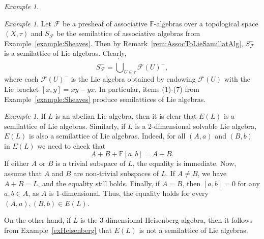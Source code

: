 \documentclass[10pt,a4paper]{amsart}
\theoremstyle{definition}
\theoremstyle{remark}
\newtheorem{ex}[thm]{Example}
\numberwithin{equation}{section}
\newtheorem*{Theorem A}{\textbf{Theorem A}}
\newtheorem*{Corollary E}{\textbf{Corollary E}}
\newtheorem*{Corollary F}{\textbf{Corollary F}}
\newtheorem*{Theorem B}{\textbf{Theorem B}}
\newtheorem*{Theorem C}{\textbf{Theorem C}}
\newtheorem*{Theorem D}{\textbf{Theorem B}}
\newtheorem*{p a}{\textbf{Proof of  Theorem A}}
\newtheorem*{p b}{\textbf{Proof of Theorem B}}
\newtheorem*{p c}{\textbf{Proof of  Theorem C}}
\newtheorem*{p d}{\textbf{Proof of  Theorem D}}
\newcommand{\C}{\mathbb{C}}
\newcommand{\0}{{\vartheta}}
\begin{document}
\begin{ex}
\begin{enumerate}
\end{enumerate}

\end{ex}

\begin{ex}\label{example:SheavesLie}
 Let $\mathcal F$ be a presheaf of associative $\mathbb{F}$-algebras over a topological space $(X, \tau)$ and
 $S_{\mathcal F}$ be the semilattice of associative algebras from  Example~\ref{example:Sheaves}.  Then  by Remark~\ref{rem:AssocToLieSamillatAlg}, $S_{\mathcal F}^{-}$ is  a semilattice of Lie algebras. Clearly,
$$S_{\mathcal F}^- =    \dot{\bigcup}  _{U \in \tau} \mathcal F (U)^-, $$ where each ${\mathcal F} (U)^-$ is the Lie algebra obtained by endowing ${\mathcal F} (U)$ with the Lie bracket
$[x,y]= xy - yx.$ In particular, items (1)-(7) from Example~\ref{example:Sheaves} produce semilattices of Lie algebras.
\end{ex}

\begin{ex}
If $L$ is an abelian Lie algebra, then it is clear that $E(L)$ is a semilattice of Lie algebras. Similarly, if $L$ is a 2-dimensional solvable Lie algebra, $E(L)$ is also a semilattice of Lie algebras.  Indeed,  for all $(A,a)$ and $(B,b)$ in $E(L)$ we need to check that
$$A+B+\mathbb{F}[a,b]=A+B.$$
If either $A$ or $B$ is a trivial subspace of $L$, the equality is immediate. Now, assume that $A$ and $B$ are non-trivial subspaces of $L$. If $A\neq B$, we have $A+B=L$, and the equality still holds. Finally, if $A=B$, then $[a,b]=0$ for any $a,b\in A$, as $A$ is 1-dimensional. Thus, the equality holds for every $(A,a),(B,b)\in E(L)$.

On the other hand, if $L$ is the 3-dimensional Heisenberg algebra, then it follows from Example~\ref{exHeisenberg} that $E(L)$ is not a semilattice of Lie algebras. 
\end{ex}
\end{document}
